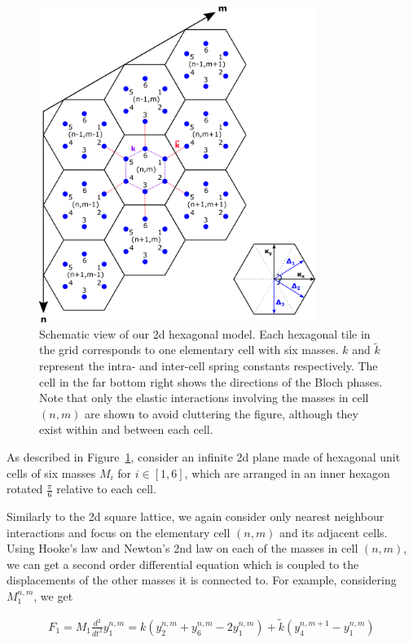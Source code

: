 \begin{figure}[!h]
\centering
\includegraphics[width=0.8\textwidth]{imgs/hexmodel.png}
\caption{\label{fig:hexscheme} Schematic view of our 2d hexagonal model. Each
  hexagonal tile in the grid corresponds to one elementary cell with six
  masses. $k$ and $\tilde{k}$ represent the intra- and inter-cell spring
  constants respectively. The cell in the far bottom right shows the directions
  of the Bloch phases. Note that only the elastic interactions involving the
  masses in cell $(n,m)$ are shown to avoid cluttering the figure, although
  they exist within and between each cell.}
\end{figure}

As described in Figure~\ref{fig:hexscheme}, consider an infinite 2d plane made
of hexagonal unit cells of six masses $M_i$ for $i\in\left[1,6\right]$, which
are arranged in an inner hexagon rotated $\frac{\pi}{6}$ relative to each cell.

Similarly to the 2d square lattice, we again consider only nearest neighbour
interactions and focus on the elementary cell $(n,m)$ and its adjacent cells.
Using Hooke's law and Newton's 2nd law on each of the masses in cell $(n,m)$,
we can get a second order differential equation which is coupled to the
displacements of the other masses it is connected to. For example, considering
$M_1^{n,m}$, we get

\begin{align}
  F_1=M_1\frac{d^{2}}{dt^{2}}y_1^{n,m}
      =k\left(y_2^{n,m}+y_6^{n,m}-2y_1^{n,m}\right)+
       \tilde{k}\left(y_4^{n,m+1}-y_1^{n,m}\right)
\label{eq:2dH1}
\end{align}

